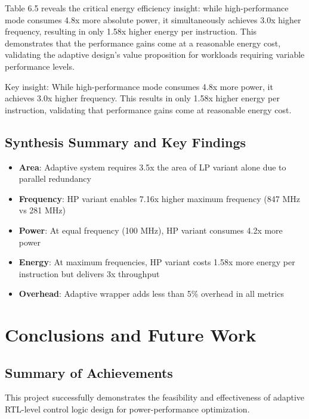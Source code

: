 \documentclass[15pt,a4paper]{report}
\begin{document}
Table 6.5 reveals the critical energy efficiency insight: while high-performance mode consumes 4.8x more absolute power, it simultaneously achieves 3.0x higher frequency, resulting in only 1.58x higher energy per instruction. This demonstrates that the performance gains come at a reasonable energy cost, validating the adaptive design's value proposition for workloads requiring variable performance levels.

Key insight: While high-performance mode consumes 4.8x more power, it achieves 3.0x higher frequency. This results in only 1.58x higher energy per instruction, validating that performance gains come at reasonable energy cost.

\section{Synthesis Summary and Key Findings}

\begin{itemize}
    \item \textbf{Area}: Adaptive system requires 3.5x the area of LP variant alone due to parallel redundancy
    
    \item \textbf{Frequency}: HP variant enables 7.16x higher maximum frequency (847 MHz vs 281 MHz)
    
    \item \textbf{Power}: At equal frequency (100 MHz), HP variant consumes 4.2x more power
    
    \item \textbf{Energy}: At maximum frequencies, HP variant costs 1.58x more energy per instruction but delivers 3x throughput
    
    \item \textbf{Overhead}: Adaptive wrapper adds less than 5\% overhead in all metrics
\end{itemize}

\newpage

\chapter{Conclusions and Future Work}

\section{Summary of Achievements}

This project successfully demonstrates the feasibility and effectiveness of adaptive RTL-level control logic design for power-performance optimization.
\end{document}
